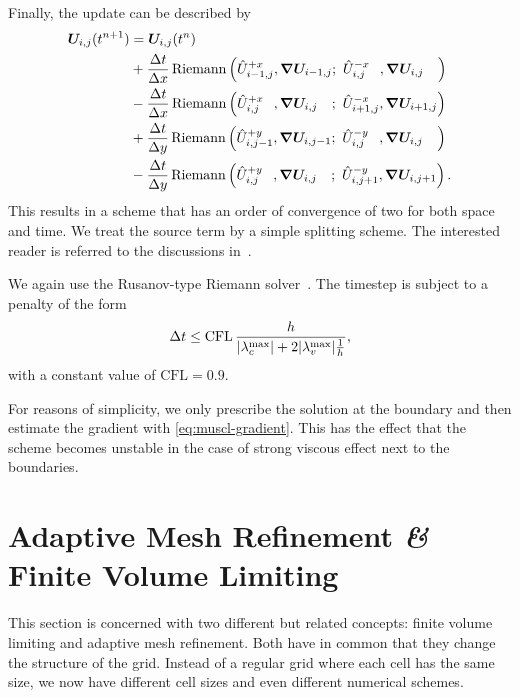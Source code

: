 Finally, the update can be described by
\begin{align}
  \begin{split}
    \cellAvg (t^{n+1}) &= \cellAvg (t^n)
    \\ &+
  \frac{\Delta t}{\Delta x}
    \Riemann \left(
      \evolvedCellAvg[i-1,j]{+x}, \gradCellAvg[i-1,j]; \ %
      \evolvedCellAvg[i,j\phantom{-1}]{-x}, \gradCellAvg[i,j\phantom{-1}]
    \right)
    \\ &-
  \frac{\Delta t}{\Delta x}
    \Riemann \left(
      \evolvedCellAvg[i,j\phantom{+1}]{+x}, \gradCellAvg[i,j\phantom{+1}]; \ %
      \evolvedCellAvg[i+1,j]{-x}, \gradCellAvg[i+1,j]
    \right)
    \\ &+
  \frac{\Delta t}{\Delta y}
    \Riemann \left(
      \evolvedCellAvg[i,j-1]{+y}, \gradCellAvg[i,j-1]; \ %
      \evolvedCellAvg[i,j\phantom{-1}]{-y}, \gradCellAvg[i,j\phantom{-1}]
    \right)
    \\ &-
  \frac{\Delta t}{\Delta y}
    \Riemann \left(
      \evolvedCellAvg[i,j\phantom{+1}]{+y}, \gradCellAvg[i,j\phantom{+1}]; \ %
      \evolvedCellAvg[i,j+1]{-y}, \gradCellAvg[i,j+1]
    \right).
  \end{split}
\end{align}
This results in a scheme that has an order of convergence of two for both space and time.
We treat the source term by a simple splitting scheme.
The interested reader is referred to the discussions in~\cite{leVeque2002finite,toro2009riemann}.

We again use the Rusanov-type Riemann solver~.
The timestep is subject to a penalty of the form
\begin{equation}\label{eq:cfl-muscl}
 \Delta t \leq  \text{CFL} \, \frac{h}{\maxConvEigen + 2 \maxViscEigen \frac{1}{h}},
\end{equation}
with a constant value of $\text{CFL} = 0.9$.

For reasons of simplicity, we only prescribe the solution at the boundary and then estimate the gradient with \cref{eq:muscl-gradient}.
This has the effect that the scheme becomes unstable in the case of strong viscous effect next to the boundaries.

\section{Adaptive Mesh Refinement \textit{\&} Finite Volume Limiting}\label{sec:grid}
This section is concerned with two different but related concepts:
finite volume limiting and adaptive mesh refinement.
Both have in common that they change the structure of the grid.
Instead of a regular grid where each cell has the same size, we now have different cell sizes and even different numerical schemes.

